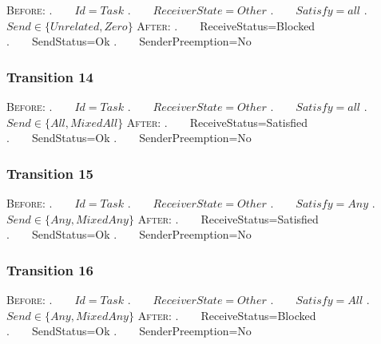 \textsc{Before:}
\newline.~~~~$Id=Task$
\newline.~~~~$ReceiverState=Other$
\newline.~~~~$Satisfy=all$
\newline.~~~~$Send \in \{Unrelated,Zero\}$
\newline\textsc{After:}
\newline.~~~~ReceiveStatus=Blocked
\newline.~~~~SendStatus=Ok
\newline.~~~~SenderPreemption=No

\subsubsection{Transition 14}


\textsc{Before:}
\newline.~~~~$Id=Task$
\newline.~~~~$ReceiverState=Other$
\newline.~~~~$Satisfy=all$
\newline.~~~~$Send \in \{All,MixedAll\}$
\newline\textsc{After:}
\newline.~~~~ReceiveStatus=Satisfied
\newline.~~~~SendStatus=Ok
\newline.~~~~SenderPreemption=No

\subsubsection{Transition 15}


\textsc{Before:}
\newline.~~~~$Id=Task$
\newline.~~~~$ReceiverState=Other$
\newline.~~~~$Satisfy=Any$
\newline.~~~~$Send \in \{Any,MixedAny\}$
\newline\textsc{After:}
\newline.~~~~ReceiveStatus=Satisfied
\newline.~~~~SendStatus=Ok
\newline.~~~~SenderPreemption=No

\subsubsection{Transition 16}


\textsc{Before:}
\newline.~~~~$Id=Task$
\newline.~~~~$ReceiverState=Other$
\newline.~~~~$Satisfy=All$
\newline.~~~~$Send \in \{Any,MixedAny\}$
\newline\textsc{After:}
\newline.~~~~ReceiveStatus=Blocked
\newline.~~~~SendStatus=Ok
\newline.~~~~SenderPreemption=No
